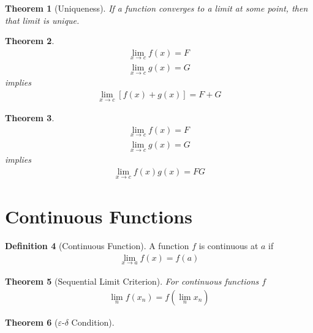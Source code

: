 \documentclass{amsart}
\numberwithin{equation}{section}
\theoremstyle{plain}
\newtheorem{theorem}{Theorem}[section]
\theoremstyle{definition}
\newtheorem{definition}[theorem]{Definition}
\theoremstyle{remark}
\begin{document}
\begin{theorem}[Uniqueness]
  If a function converges to a limit at some point, then that limit is unique.
\end{theorem}

\begin{theorem}
  \begin{align}
    \lim_{x\to c} f(x) = F\\
    \lim_{x\to c} g(x) = G
  \end{align}
  implies
  \begin{align}
    \lim_{x\to c} \left[f(x) + g(x) \right] = F+G 
  \end{align}
\end{theorem}

\begin{theorem}
  \begin{align}
    \lim_{x\to c} f(x) = F\\
    \lim_{x\to c} g(x) = G
  \end{align}
  implies
  \begin{align}
    \lim_{x\to c} f(x)g(x) = FG
  \end{align}
\end{theorem}

\section{Continuous Functions}


\begin{definition}[Continuous Function]
  A function $f$ is continuous at $a$ if
  \begin{align}
    \lim_{x\to a} f(x) = f(a)
  \end{align}
\end{definition}

\begin{theorem}[Sequential Limit Criterion]
  For continuous functions $f$
  \begin{align}
    \lim_n f\left(x_n\right) = f\left(\lim_n x_n\right)
  \end{align}
\end{theorem}

\begin{theorem}[$\varepsilon$-$\delta$ Condition]
\end{theorem}
\end{document}
